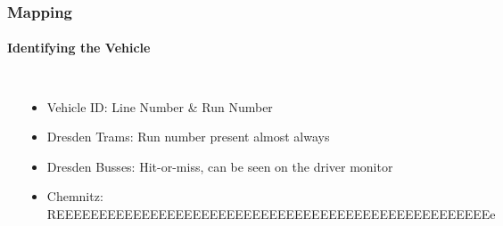 \begin{frame}
  \frametitle{Mapping}
  \framesubtitle{Identifying the Vehicle}
    \begin{columns}
      \centering
      \includegraphics[width=.8\columnwidth]{./figs/tram-id-dresden.png}
    \begin{itemize}
      \item Vehicle ID: Line Number \& Run Number
      \item Dresden Trams: Run number present almost always
      \item Dresden Busses: Hit-or-miss, can be seen on the driver monitor
      \item Chemnitz: REEEEEEEEEEEEEEEEEEEEEEEEEEEEEEEEEEEEEEEEEEEEEEEEEEEe
    \end{itemize}
    \end{columns}
\end{frame}

